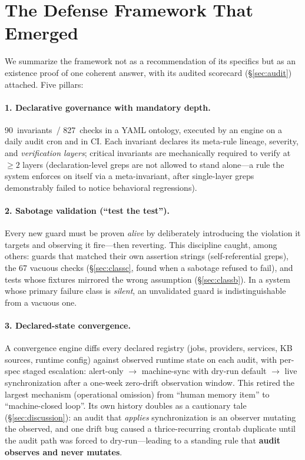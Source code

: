 \section{The Defense Framework That Emerged}\label{sec:defense}

We summarize the framework not as a recommendation of its specifics but
as an existence proof of one coherent answer, with its audited scorecard
(\S\ref{sec:audit}) attached. Five pillars:

\paragraph{1. Declarative governance with mandatory depth.}
90~invariants~/ 827~checks in a YAML ontology, executed by an engine on a
daily audit cron and in CI. Each invariant declares its meta-rule
lineage, severity, and \emph{verification layers}; critical invariants
are mechanically required to verify at ${\geq}2$ layers
(declaration-level greps are not allowed to stand alone---a rule the
system enforces on itself via a meta-invariant, after single-layer greps
demonstrably failed to notice behavioral regressions).

\paragraph{2. Sabotage validation (``test the test'').}
Every new guard must be proven \emph{alive} by deliberately introducing
the violation it targets and observing it fire---then reverting. This
discipline caught, among others: guards that matched their own assertion
strings (self-referential greps), the 67 vacuous checks
(\S\ref{sec:classc}, found when a sabotage refused to fail), and tests
whose fixtures mirrored the wrong assumption (\S\ref{sec:classb}). In a
system whose primary failure class is \emph{silent}, an unvalidated guard
is indistinguishable from a vacuous one.

\paragraph{3. Declared-state convergence.}
A convergence engine diffs every declared registry (jobs, providers,
services, KB sources, runtime config) against observed runtime state on
each audit, with per-spec staged escalation: alert-only $\rightarrow$
machine-sync with dry-run default $\rightarrow$ live synchronization
after a one-week zero-drift observation window. This retired the largest
 mechanism (operational omission) from ``human memory item''
to ``machine-closed loop''. Its own history doubles as a cautionary tale
(\S\ref{sec:discussion}): an audit that \emph{applies} synchronization is
an observer mutating the observed, and one drift bug caused a
thrice-recurring crontab duplicate until the audit path was forced to
dry-run---leading to a standing rule that \textbf{audit observes and
never mutates}.

